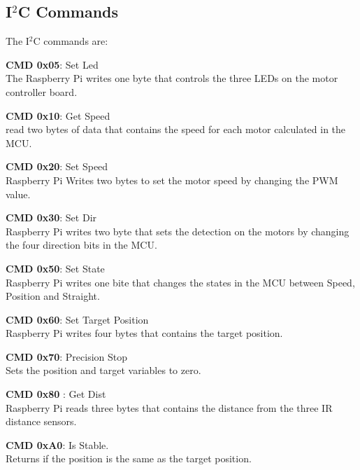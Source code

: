\subsection{I$^2$C Commands}
The I$^2$C commands are:

\begin{itemize}
	\begin{item}
		\textbf{ CMD 0x05}: Set Led\\ The Raspberry Pi writes one byte that controls the three LEDs on the motor controller board.
	\end{item}

	\begin{item}
		\textbf{ CMD 0x10}: Get Speed\\ read two bytes of data that contains the speed for each motor calculated in the MCU.
	\end{item}
	
	\begin{item}
		\textbf{ CMD 0x20}: Set Speed \\ Raspberry Pi Writes two bytes to set the motor speed by changing the PWM value.
	\end{item}	
	
	\begin{item}
		\textbf{ CMD 0x30}: Set Dir\\ Raspberry Pi writes two byte that sets the detection on the motors by changing the four direction bits in the MCU.
	\end{item}

	\begin{item}
		\textbf{CMD 0x50}: Set State\\ Raspberry Pi writes one bite that changes the states in the MCU between Speed, Position and Straight. 
	\end{item}
	
	\begin{item}
		\textbf{ CMD 0x60}: Set Target Position\\ Raspberry Pi writes four bytes that contains the target position. 
	\end{item}
	
	\begin{item}
		\textbf{CMD 0x70}:  Precision Stop\\ Sets the position and target variables to zero.
	\end{item}

	\begin{item}
		\textbf{CMD 0x80 }: Get Dist\\ Raspberry Pi reads three bytes that contains the distance from the three IR distance sensors.
	\end{item}
			

	\begin{item}
		\textbf{ CMD 0xA0}: Is Stable. \\ Returns if the position is the same as the target position.
	\end{item}		

\end{itemize}